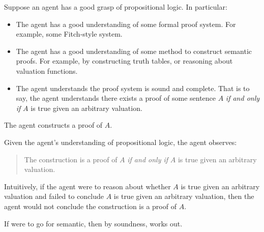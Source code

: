 \begin{note}
  \begin{illustration}
    \label{illu:sketch:prop-logic}
    Suppose an agent has a good grasp of propositional logic.
    In particular:
    \begin{itemize}
    \item
      The agent has a good understanding of some formal proof system.
      For example, some Fitch-style system.
    \item
      The agent has a good understanding of some method to construct semantic proofs.
      For example, by constructing truth tables, or reasoning about valuation functions.
    \item
      The agent understands the proof system is sound and complete.
      That is to say, the agent understands there exists a proof of some sentence \(A\) \emph{if and only if} \(A\) is true given an arbitrary valuation.
    \end{itemize}
    The agent constructs a proof of \(A\).

    Given the agent's understanding of propositional logic, the agent observes:
    \begin{quote}
      The construction is a proof of \(A\) \emph{if and only if} \(A\) is true given an arbitrary valuation.
    \end{quote}
  \end{illustration}

  Intuitively, if the agent were to reason about whether \(A\) is true given an arbitrary valuation and failed to conclude \(A\) is true given an arbitrary valuation, then the agent would not conclude the construction is a proof of \(A\).

  If were to go for semantic, then by soundness, works out.
\end{note}


